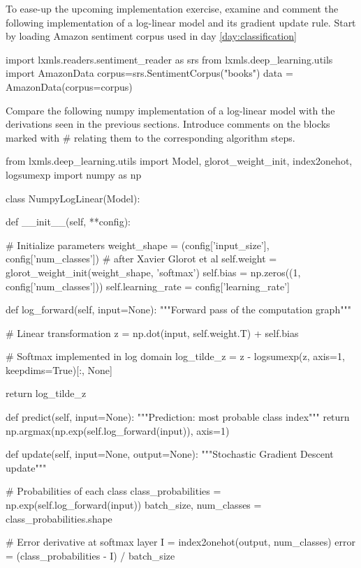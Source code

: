 \begin{exercise}
\label{exercise:exerciseNumpy1}
To ease-up the upcoming implementation exercise, examine and comment the following implementation of a log-linear model and its gradient update rule.
Start by loading Amazon sentiment corpus used in day \ref{day:classification}
\begin{python}
import lxmls.readers.sentiment_reader as srs
from lxmls.deep_learning.utils import AmazonData
corpus=srs.SentimentCorpus("books")
data = AmazonData(corpus=corpus)
\end{python}
Compare the following numpy implementation of a log-linear model with the derivations seen in the previous sections. Introduce comments on the blocks marked with \# relating them to the corresponding algorithm steps.
\begin{python}
from lxmls.deep_learning.utils import Model, glorot_weight_init, index2onehot, logsumexp
import numpy as np

class NumpyLogLinear(Model):

    def __init__(self, **config):

        # Initialize parameters
        weight_shape = (config['input_size'], config['num_classes'])
        # after Xavier Glorot et al
        self.weight = glorot_weight_init(weight_shape, 'softmax')
        self.bias = np.zeros((1, config['num_classes']))
        self.learning_rate = config['learning_rate']

    def log_forward(self, input=None):
        """Forward pass of the computation graph"""

        # Linear transformation
        z = np.dot(input, self.weight.T) + self.bias

        # Softmax implemented in log domain
        log_tilde_z = z - logsumexp(z, axis=1, keepdims=True)[:, None]

        return log_tilde_z

    def predict(self, input=None):
        """Prediction: most probable class index"""
        return np.argmax(np.exp(self.log_forward(input)), axis=1)

    def update(self, input=None, output=None):
        """Stochastic Gradient Descent update"""

        # Probabilities of each class
        class_probabilities = np.exp(self.log_forward(input))
        batch_size, num_classes = class_probabilities.shape

        # Error derivative at softmax layer
        I = index2onehot(output, num_classes)
        error = (class_probabilities - I) / batch_size


\end{python}
\end{exercise}
